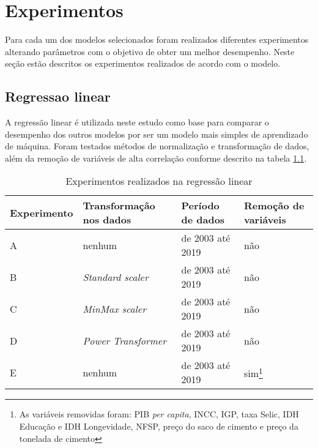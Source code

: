 
\chapter{Experimentos}

Para cada um dos modelos selecionados foram realizados diferentes experimentos
alterando parâmetros com o objetivo de obter um melhor 
desempenho. Neste seção estão descritos os experimentos realizados de acordo 
com o modelo.


\section{Regressao linear}

A regressão linear é utilizada 
neste estudo como base para comparar o desempenho dos
outros modelos por ser um modelo mais simples de aprendizado de máquina. 
Foram testados métodos de normalização  e transformação de 
dados, além da 
remoção de variáveis de alta correlação conforme 
descrito na tabela \ref{tab:exp-reg-lin}. 

\begin{table}
    \centering
    \caption{Experimentos realizados na regressão linear}
    \begin{tabular}{llll}
        \toprule
        Experimento & Transformação nos dados     & Período de dados & Remoção de variáveis  \\
        \midrule
        A           & nenhum & de 2003 até 2019            & não~                                     \\
        B           & \textit{Standard scaler}~            & de 2003 até 2019            & não~ ~                                   \\
        C           & \textit{MinMax scaler}~ ~            & de 2003 até 2019            & não~ ~ ~                                 \\
        D           & \textit{Power Transformer}           & de 2003 até 2019            & não                                      \\
        E           & nenhum & de 2003 até 2019            & sim\footnote{As variáveis removidas foram: PIB \textit{per capita}, INCC, IGP, taxa Selic, IDH Educação e IDH Longevidade, 
        NFSP, preço do saco de cimento e preço da tonelada de cimento}                                      \\
        \bottomrule
    \end{tabular}
    \label{tab:exp-reg-lin}
\end{table}

